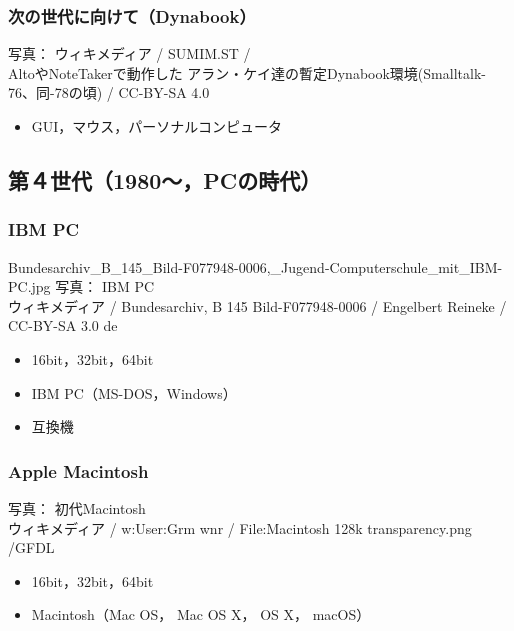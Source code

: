 \documentclass[handout]{beamer}                   %
\begin{document}
\begin{frame}
  \frametitle{次の世代に向けて（Dynabook）}
        {\tiny 写真： ウィキメディア /  SUMIM.ST / \\
          AltoやNoteTakerで動作した
          アラン・ケイ達の暫定Dynabook環境(Smalltalk-76、同-78の頃) /
          CC-BY-SA 4.0}
  \begin{itemize}
    \item GUI，マウス，パーソナルコンピュータ
  \end{itemize}
  \vfill
\end{frame}

\subsection{第４世代（1980〜，PCの時代）}
\begin{frame}
  \frametitle{IBM PC}
{Bundesarchiv_B_145_Bild-F077948-0006,_Jugend-Computerschule_mit_IBM-PC.jpg}
      {\tiny
          写真： IBM PC \\
          ウィキメディア /
          Bundesarchiv, B 145 Bild-F077948-0006 /
          Engelbert Reineke / CC-BY-SA 3.0 de
      }
  \begin{itemize}
    \item 16bit，32bit，64bit
    \item IBM PC（MS-DOS，Windows）
    \item 互換機
  \end{itemize}
  \vfill
\end{frame}

\begin{frame}
  \frametitle{Apple Macintosh}
      {\tiny
          写真： 初代Macintosh \\
          ウィキメディア / w:User:Grm wnr / 
          File:Macintosh 128k transparency.png /GFDL
      }
  \begin{itemize}
    \item 16bit，32bit，64bit
    \item Macintosh（Mac OS， Mac OS X， OS X， macOS）
  \end{itemize}
  \vfill
\end{frame}
\end{document}
